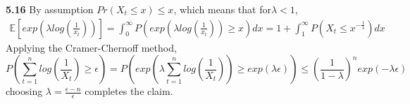 





















\noindent \textbf{5.16}
By assumption $Pr(X_t\leq x)\leq x$, which means that for$\lambda <1$,
\begin{align}
\mathbb{E}\left[exp(\lambda log(\frac{1}{x_t}))\right] = \int_0^\infty P(exp(\lambda log(\frac{1}{x_t}))\geq x)dx = 1 +\int_1^\infty P(X_t \leq x^{-\frac{1}{\lambda}})dx
\end{align}
Applying the Cramer-Chernoff method,
$$P\left(\sum_{t=1}^n log(\frac{1}{X_t}) \geq \epsilon\right) = P\left(exp(\lambda \sum_{t=1}^n log(\frac{1}{X_t})) \geq exp(\lambda \epsilon) \right) \leq \left(\frac{1}{1-\lambda}\right)^n exp (-\lambda \epsilon)$$
choosing $\lambda  = \frac{\epsilon-n}{\epsilon}$ completes the claim.



